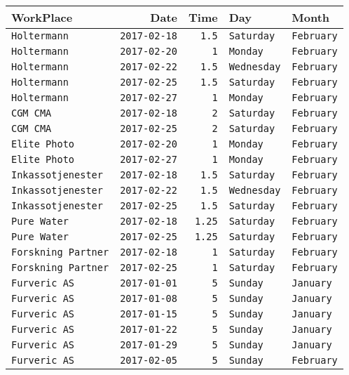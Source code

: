 \documentclass[11pt,A4paper,]{article}
\begin{document}
\begin{longtable}[]{@{}lrrll@{}}
\toprule
WorkPlace & Date & Time & Day & Month\tabularnewline
\midrule
\endhead
\texttt{Holtermann} & \texttt{2017-02-18} & \texttt{1.5} &
\texttt{Saturday} & \texttt{February}\tabularnewline
\texttt{Holtermann} & \texttt{2017-02-20} & \texttt{1} & \texttt{Monday}
& \texttt{February}\tabularnewline
\texttt{Holtermann} & \texttt{2017-02-22} & \texttt{1.5} &
\texttt{Wednesday} & \texttt{February}\tabularnewline
\texttt{Holtermann} & \texttt{2017-02-25} & \texttt{1.5} &
\texttt{Saturday} & \texttt{February}\tabularnewline
\texttt{Holtermann} & \texttt{2017-02-27} & \texttt{1} & \texttt{Monday}
& \texttt{February}\tabularnewline
\texttt{CGM\ CMA} & \texttt{2017-02-18} & \texttt{2} & \texttt{Saturday}
& \texttt{February}\tabularnewline
\texttt{CGM\ CMA} & \texttt{2017-02-25} & \texttt{2} & \texttt{Saturday}
& \texttt{February}\tabularnewline
\texttt{Elite\ Photo} & \texttt{2017-02-20} & \texttt{1} &
\texttt{Monday} & \texttt{February}\tabularnewline
\texttt{Elite\ Photo} & \texttt{2017-02-27} & \texttt{1} &
\texttt{Monday} & \texttt{February}\tabularnewline
\texttt{Inkassotjenester} & \texttt{2017-02-18} & \texttt{1.5} &
\texttt{Saturday} & \texttt{February}\tabularnewline
\texttt{Inkassotjenester} & \texttt{2017-02-22} & \texttt{1.5} &
\texttt{Wednesday} & \texttt{February}\tabularnewline
\texttt{Inkassotjenester} & \texttt{2017-02-25} & \texttt{1.5} &
\texttt{Saturday} & \texttt{February}\tabularnewline
\texttt{Pure\ Water} & \texttt{2017-02-18} & \texttt{1.25} &
\texttt{Saturday} & \texttt{February}\tabularnewline
\texttt{Pure\ Water} & \texttt{2017-02-25} & \texttt{1.25} &
\texttt{Saturday} & \texttt{February}\tabularnewline
\texttt{Forskning\ Partner} & \texttt{2017-02-18} & \texttt{1} &
\texttt{Saturday} & \texttt{February}\tabularnewline
\texttt{Forskning\ Partner} & \texttt{2017-02-25} & \texttt{1} &
\texttt{Saturday} & \texttt{February}\tabularnewline
\texttt{Furveric\ AS} & \texttt{2017-01-01} & \texttt{5} &
\texttt{Sunday} & \texttt{January}\tabularnewline
\texttt{Furveric\ AS} & \texttt{2017-01-08} & \texttt{5} &
\texttt{Sunday} & \texttt{January}\tabularnewline
\texttt{Furveric\ AS} & \texttt{2017-01-15} & \texttt{5} &
\texttt{Sunday} & \texttt{January}\tabularnewline
\texttt{Furveric\ AS} & \texttt{2017-01-22} & \texttt{5} &
\texttt{Sunday} & \texttt{January}\tabularnewline
\texttt{Furveric\ AS} & \texttt{2017-01-29} & \texttt{5} &
\texttt{Sunday} & \texttt{January}\tabularnewline
\texttt{Furveric\ AS} & \texttt{2017-02-05} & \texttt{5} &
\texttt{Sunday} & \texttt{February}\tabularnewline

\end{longtable}
\end{document}
